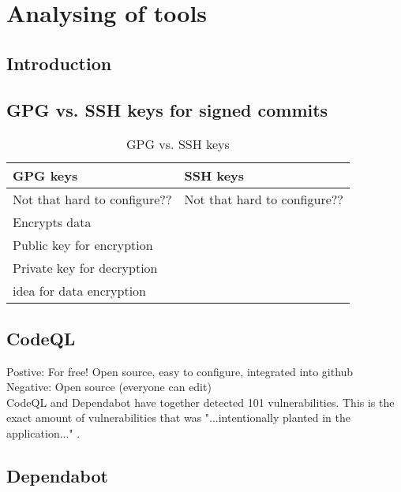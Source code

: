 \chapter{Analysing of tools}
\section{Introduction}

\section{GPG vs. SSH keys for signed commits}


\begin{table}[!ht]
    \centering
    \begin{tabular}{|p{}|p{}|}
    \hline
        \cellcolor{lightblue!} GPG keys  & \cellcolor{lightblue!} SSH keys \\ \hline
        Not that hard to configure?? &  Not that hard to configure??\\\hline
        Encrypts data &\\ \hline
        Public key for encryption &\\ \hline
        Private key for decryption &\\ \hline
        \acrshort{idea} for data encryption &\\ 
    \end{tabular}
    \caption{GPG vs. SSH keys}

\end{table}

\section{CodeQL}
Postive: For free! Open source, easy to configure, integrated into github
\\
Negative: Open source (everyone can edit)
\\
CodeQL and Dependabot have together detected 101 vulnerabilities. This is the exact amount of vulnerabilities that was "...intentionally planted in the application..." \cite{owaspJuiceShop}.

\section{Dependabot}

